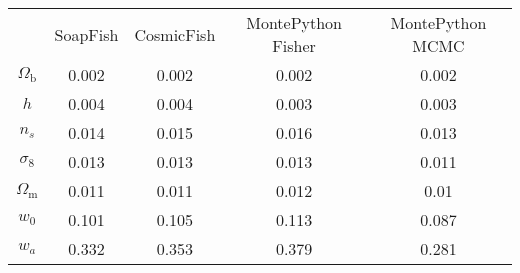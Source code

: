 \begin{table}
\centering
\begin{tabular}{|c|c|c|c|c|}
 & SoapFish & CosmicFish & MontePython Fisher & MontePython MCMC \\
$\Omega_\mathrm{b}$ & 0.002 & 0.002 & 0.002 & 0.002 \\
$h$ & 0.004 & 0.004 & 0.003 & 0.003 \\
$n_s$ & 0.014 & 0.015 & 0.016 & 0.013 \\
$\sigma_8$ & 0.013 & 0.013 & 0.013 & 0.011 \\
$\Omega_\mathrm{m}$ & 0.011 & 0.011 & 0.012 & 0.01 \\
$w_0$ & 0.101 & 0.105 & 0.113 & 0.087 \\
$w_a$ & 0.332 & 0.353 & 0.379 & 0.281 \\
\end{tabular}
\end{table}
